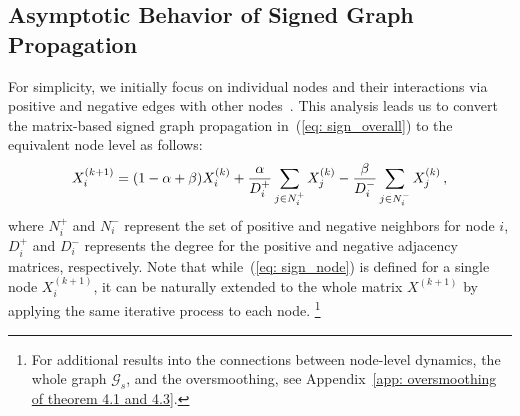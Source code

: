 \subsection{Asymptotic Behavior of Signed Graph Propagation}
\label{subsec: sb theory}
For simplicity, we initially focus on individual nodes and their interactions via positive and negative edges with other nodes~\citep{signed_dynamics_paper_review}. 
This analysis leads us to convert the matrix-based signed graph propagation in~(\ref{eq: sign_overall}) to the equivalent node level as follows:
\begin{equation}
\small
\label{eq: sign_node}
    X_i^{(k+1)} = (1-\alpha + \beta) X_i^{(k)} + \frac{\alpha}{D_i^+}\sum_{j\in N_i^+}X_j^{(k)}
    -\frac{\beta}{D_i^-} \sum_{j\in N_i^-}X_j^{(k)}\,,
\end{equation}
where $N_i^+$ and $N_i^-$ represent the set of positive and negative neighbors for node \(i\), \(D_i^+\) and \(D_i^-\) represents the degree for the positive and negative adjacency matrices, respectively. 
Note that while~(\ref{eq: sign_node}) is defined for a single node \(X_i^{(k+1)}\), it can be naturally extended to the whole matrix \(X^{(k+1)}\) by applying the same iterative process to each node. \footnote{For additional results into the connections between node-level dynamics, the whole graph \(\mathcal{G}_s\), and the oversmoothing, see Appendix~\ref{app: oversmoothing of theorem 4.1 and 4.3}.}

